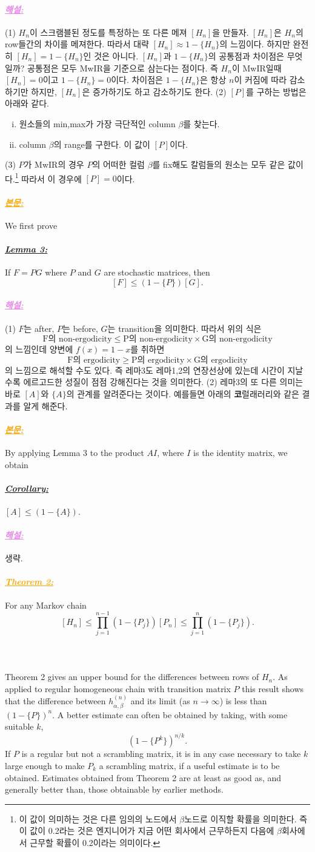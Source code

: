 \documentclass[12pt,oneside,english,a4paper]{article}
\def\bk{\paragraph{\LARGE$$}\LARGE}
\newcommand{\para}[1]{\paragraph{\LARGE\it\underline{\textbf{#1:}}}\LARGE}
\newcommand{\paraviolet}[1]{\paragraph{\LARGE\textcolor{violet}{\it\underline{\textbf{#1:}}}}\LARGE}
\newcommand{\paraorange}[1]{\paragraph{\LARGE\textcolor{orange}{\it\underline{\textbf{#1:}}}}\LARGE}
\begin{document}
\paraviolet{해설} (1) $H_n$이 스크램블된 정도를 특정하는 또 다른 메져 $[H_n]$을 만들자. $[H_n]$은 $H_n$의 row들간의 차이를 메져한다. 따라서 대략 $[H_n]\approx 1-\{H_n\}$의 느낌이다. 하지만 완전히 $[H_n]=1-\{H_n\}$인 것은 아니다. $[H_n]$과 $1-\{H_n\}$의 공통점과 차이점은 무엇일까? 공통점은 모두 MwIR을 기준으로 삼는다는 점이다. 즉 $H_n$이 MwIR일때 $[H_n]=0$이고 $1-\{H_n\}=0$이다. 차이점은 $1-\{H_n\}$은 항상 $n$이 커짐에 따라 감소하기만 하지만, $[H_n]$은 증가하기도 하고 감소하기도 한다. (2) $[P]$를 구하는 방법은 아래와 같다. 
\begin{enumerate}[(i)]
\item 원소들의 min,max가 가장 극단적인 column $\beta$를 찾는다. 
\item column $\beta$의 range를 구한다. 이 값이 $[P]$이다. 
\end{enumerate}
(3) $P$가 MwIR의 경우 $P$의 어떠한 컬럼 $\beta$를 fix해도 칼럼들의 원소는 모두 같은 값이다.\footnote{이 값이 의미하는 것은 다른 임의의 노드에서 $\beta$노드로 이직할 확률을 의미한다. 즉 이 값이 0.2라는 것은 엔지니어가 지금 어떤 회사에서 근무하든지 다음에 $\beta$회사에서 근무할 확률이 0.2이라는 의미이다.} 따라서 이 경우에 $[P]=0$이다. 

\paraorange{본문} We first prove 

\para{Lemma 3} If $F=PG$ where $P$ and $G$ are stochastic matrices, then 
\[
[F] \leq (1-\{P\})[G].
\]

\paraviolet{해설} (1) $F$는 after, $P$는 before, $G$는 transition을 의미한다. 따라서 위의 식은
\[
\mbox{F의 non-ergodicity} \leq \mbox{P의 non-ergodicity} \times \mbox{G의 non-ergodicity}
\]
의 느낌인데 양변에 $f(x)=1-x$를 취하면 
\[
\mbox{F의 ergodicity} \geq \mbox{P의 ergodicity} \times \mbox{G의 ergodicity}
\]
의 느낌으로 해석할 수도 있다. 즉 레마3도 레마1,2의 연장선상에 있는데 시간이 지날수록 에르고드한 성질이 점점 강해진다는 것을 의미한다. (2) 레마3의 또 다른 의미는 바로 $[A]$와 $\{A\}$의 관계를 알려준다는 것이다. 예를들면 아래의 {\bf 코}럴래러리와 같은 결과를 알게 해준다. 

\paraorange{본문} By applying Lemma 3 to the product $AI$, where $I$ is the identity matrix, we obtain
\para{Corollary} $[A] \leq (1-\{A\})$.

\paraviolet{해설} 생략.

\paraorange{Theorem 2} For any Markov chain 
\[
[H_n] \leq \prod_{j=1}^{n-1}(1-\{P_j\})[P_n] \leq \prod_{j=1}^{n}(1-\{P_j\}).
\]
\bk Theorem 2 gives an upper bound for the differences between rows of $H_n$. As applied to regular homogeneous chain with transition matrix $P$ this result shows that the difference between $h_{\alpha,\beta}^{(n)}$ and its limit (as $n\to \infty$) is less than $(1-\{P\})^n$. A better estimate can often be obtained by taking, with some suitable $k$, 
\[
(1-\{P^k\})^{n/k}.
\]
If $P$ is a regular but not a scrambling matrix, it is in any case necessary to take $k$ large enough to make $P_k$ a scrambling matrix, if a useful estimate is to be obtained. Estimates obtained from Theorem 2 are at least as good as, and generally better than, those obtainable by earlier methods.
\end{document}
